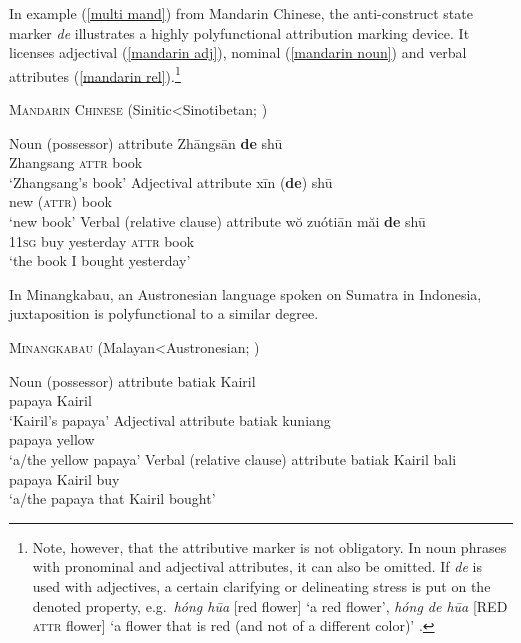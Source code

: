 In example (\ref{multi mand}) from Mandarin Chinese, the anti-construct state marker \textit{de} illustrates a highly polyfunctional attribution marking device. It licenses adjectival (\ref{mandarin adj}), nominal (\ref{mandarin noun}) and verbal attributes (\ref{mandarin rel}).\footnote{Note, however, that the attributive marker is not obligatory. In noun phrases with pronominal and adjectival attributes, it can also be omitted. If \textit{de} is used with adjectives, a certain clarifying or delineating stress is put on the denoted property, e.g.~\textit{hóng hūa} [red flower] ‘a red flower’, \textit{hóng de hūa} [RED \textsc{attr} flower] ‘a flower that is red (and not of a different color)’ \citep[119–123]{li-etal1981}.}

\begin{exe}
\ex \textsc{Mandarin Chinese} (Sinitic<Sinotibetan; \citealt{li-etal1981}) \label{multi mand}
\begin{xlist}
\ex	Noun (possessor) attribute \label{mandarin noun}
\gll	Zhāngsān 	\textbf{de} 	shū\\
	Zhangsang 	{\textsc{attr}} 	book\\
\glt	‘Zhangsang's book’
\ex	Adjectival attribute \label{mandarin adj}
\gll	xīn 		(\textbf{de}) 	shū\\
	new	 	({\textsc{attr}}) 	book\\
\glt	‘new book’
\ex	Verbal (relative clause) attribute \label{mandarin rel}
\gll	wŏ zuótiān 	măi 	\textbf{de} 	shū\\
	1\textsc{1sg} 	buy	yesterday 	{\textsc{attr}} 	book\\
\glt	‘the book I bought yesterday’
\end{xlist}
\end{exe}
In Minangkabau, an Austronesian language spoken on Sumatra in Indonesia, juxtaposition is polyfunctional to a similar degree.
\begin{exe}
\ex \textsc{Minangkabau} (Malayan<Austronesian; \citealt[3–4]{gil2005}) \label{multi minangkabau}
\begin{xlist}
\ex Noun (possessor) attribute
\gll	batiak Kairil\\
	papaya Kairil\\
\glt	‘Kairil's papaya’
\ex Adjectival attribute
\gll	batiak kuniang\\
	papaya yellow\\
\glt	‘a/the yellow papaya’
\ex Verbal (relative clause) attribute
\gll	batiak Kairil bali\\
	papaya Kairil buy\\
\glt	‘a/the papaya that Kairil bought’
\end{xlist}
\end{exe}
